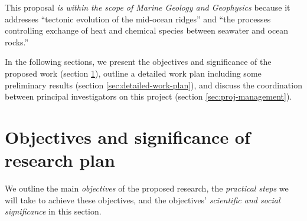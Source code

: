 \documentclass[authoryear,round,12pt]{article}
\begin{document}
This proposal \textit{is within the scope of Marine Geology and
  Geophysics} because it addresses ``tectonic evolution of the
mid-ocean ridges'' and ``the processes controlling exchange of heat
and chemical species between seawater and ocean rocks.''

In the following sections, we present the objectives and significance
of the proposed work (section \ref{sec:object-expect-signif}), outline
a detailed work plan including some preliminary results (section
\ref{sec:detailed-work-plan}), and discuss the coordination between
principal investigators on this project (section
\ref{sec:proj-management}).




\section{Objectives and significance of research plan}
\label{sec:object-expect-signif}


We outline the main \textit{objectives} of the proposed research,
the \textit{practical steps} we will take to achieve these objectives,
and the objectives' \textit{scientific and social significance} in
this section.
\end{document}
